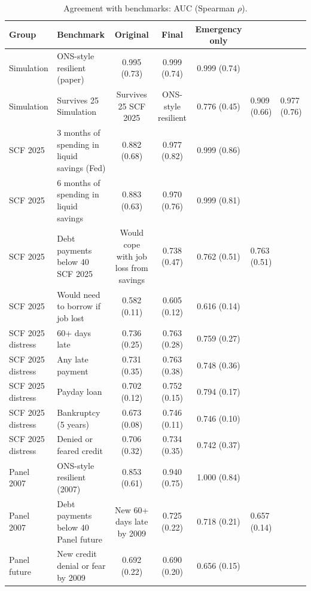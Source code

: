 \begin{table}[htbp]
\centering
\small
\caption{Agreement with benchmarks: AUC (Spearman $\rho$).}
\label{tab:bench}
\begin{tabular}{llccc}
\toprule
Group & Benchmark & Original & Final & Emergency only \\
\midrule
Simulation & ONS-style resilient (paper) & 0.995 (0.73) & 0.999 (0.74) & 0.999 (0.74) \\
Simulation & Survives 25%
Simulation & Survives 25%
SCF 2025 & ONS-style resilient & 0.776 (0.45) & 0.909 (0.66) & 0.977 (0.76) \\
SCF 2025 & 3 months of spending in liquid savings (Fed) & 0.882 (0.68) & 0.977 (0.82) & 0.999 (0.86) \\
SCF 2025 & 6 months of spending in liquid savings & 0.883 (0.63) & 0.970 (0.76) & 0.999 (0.81) \\
SCF 2025 & Debt payments below 40%
SCF 2025 & Would cope with job loss from savings & 0.738 (0.47) & 0.762 (0.51) & 0.763 (0.51) \\
SCF 2025 & Would need to borrow if job lost & 0.582 (0.11) & 0.605 (0.12) & 0.616 (0.14) \\
SCF 2025 distress & 60+ days late & 0.736 (0.25) & 0.763 (0.28) & 0.759 (0.27) \\
SCF 2025 distress & Any late payment & 0.731 (0.35) & 0.763 (0.38) & 0.748 (0.36) \\
SCF 2025 distress & Payday loan & 0.702 (0.12) & 0.752 (0.15) & 0.794 (0.17) \\
SCF 2025 distress & Bankruptcy (5 years) & 0.673 (0.08) & 0.746 (0.11) & 0.746 (0.10) \\
SCF 2025 distress & Denied or feared credit & 0.706 (0.32) & 0.734 (0.35) & 0.742 (0.37) \\
Panel 2007 & ONS-style resilient (2007) & 0.853 (0.61) & 0.940 (0.75) & 1.000 (0.84) \\
Panel 2007 & Debt payments below 40%
Panel future & New 60+ days late by 2009 & 0.725 (0.22) & 0.718 (0.21) & 0.657 (0.14) \\
Panel future & New credit denial or fear by 2009 & 0.692 (0.22) & 0.690 (0.20) & 0.656 (0.15) \\
\bottomrule
\end{tabular}
\end{table}
